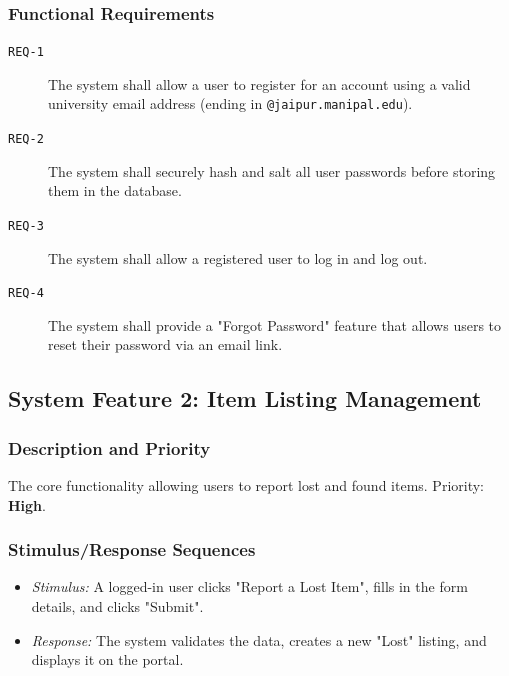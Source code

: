 \documentclass[11pt, a4paper]{article}
\begin{document}
\subsubsection{Functional Requirements}
\begin{description}
    \item[\texttt{REQ-1}] The system shall allow a user to register for an account using a valid university email address (ending in \texttt{@jaipur.manipal.edu}).
    \item[\texttt{REQ-2}] The system shall securely hash and salt all user passwords before storing them in the database.
    \item[\texttt{REQ-3}] The system shall allow a registered user to log in and log out.
    \item[\texttt{REQ-4}] The system shall provide a "Forgot Password" feature that allows users to reset their password via an email link.
\end{description}

\subsection{System Feature 2: Item Listing Management}
\subsubsection{Description and Priority}
The core functionality allowing users to report lost and found items. Priority: \textbf{High}.

\subsubsection{Stimulus/Response Sequences}
\begin{itemize}
    \item \textit{Stimulus:} A logged-in user clicks "Report a Lost Item", fills in the form details, and clicks "Submit".
    \item \textit{Response:} The system validates the data, creates a new "Lost" listing, and displays it on the portal.
\end{itemize}
\end{document}
